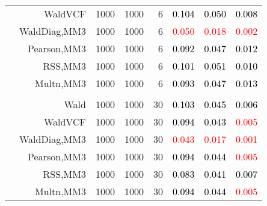 \documentclass[
]{article}
\begin{document}
\begin{table}[H]
{\begin{tabular}[t]{lrrrrrrr}
\hspace{1em} & WaldVCF & 1000 & 1000 & 6 & \textcolor{black}{0.104} & \textcolor{black}{0.050} & \textcolor{black}{0.008}\\

\hspace{1em} & WaldDiag,MM3 & 1000 & 1000 & 6 & \textcolor{red}{0.050} & \textcolor{red}{0.018} & \textcolor{red}{0.002}\\

\hspace{1em} & Pearson,MM3 & 1000 & 1000 & 6 & \textcolor{black}{0.092} & \textcolor{black}{0.047} & \textcolor{black}{0.012}\\

\hspace{1em} & RSS,MM3 & 1000 & 1000 & 6 & \textcolor{black}{0.101} & \textcolor{black}{0.051} & \textcolor{black}{0.010}\\

\hspace{1em} & Multn,MM3 & 1000 & 1000 & 6 & \textcolor{black}{0.093} & \textcolor{black}{0.047} & \textcolor{black}{0.013}\\
\cmidrule{1-8}
\addlinespace[0.3em]
\multicolumn{8}{l}{\textbf{3F 15V}}\\
\hspace{1em} & Wald & 1000 & 1000 & 30 & \textcolor{black}{0.103} & \textcolor{black}{0.045} & \textcolor{black}{0.006}\\

\hspace{1em} & WaldVCF & 1000 & 1000 & 30 & \textcolor{black}{0.094} & \textcolor{black}{0.043} & \textcolor{red}{0.005}\\

\hspace{1em} & WaldDiag,MM3 & 1000 & 1000 & 30 & \textcolor{red}{0.043} & \textcolor{red}{0.017} & \textcolor{red}{0.001}\\

\hspace{1em} & Pearson,MM3 & 1000 & 1000 & 30 & \textcolor{black}{0.094} & \textcolor{black}{0.044} & \textcolor{red}{0.005}\\

\hspace{1em} & RSS,MM3 & 1000 & 1000 & 30 & \textcolor{black}{0.083} & \textcolor{black}{0.041} & \textcolor{black}{0.007}\\

\hspace{1em} & Multn,MM3 & 1000 & 1000 & 30 & \textcolor{black}{0.094} & \textcolor{black}{0.044} & \textcolor{red}{0.005}\\
\bottomrule
\end{tabular}}
\endgroup{}
\end{table}
\end{document}
